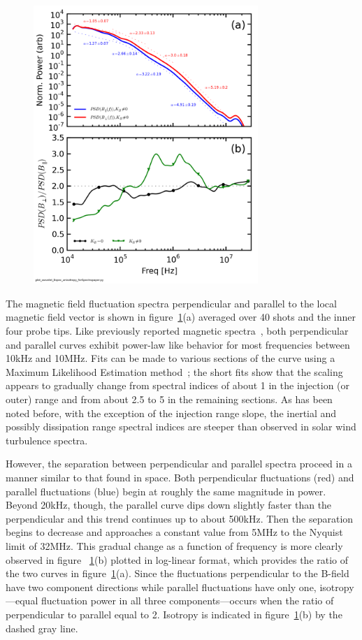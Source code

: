 \documentclass[aip,prl,amsmath,amssymb,reprint,superscriptaddress]{revtex4-1} %
\begin{document}
\begin{figure}[!htbp]
\centerline{
\includegraphics[width=8.5cm]{Bperppara_chan1t4_1mWbspectra_40t60us_wAsymRatio}}
\caption{\label{fig:spectra}}
\end{figure}

The magnetic field fluctuation spectra perpendicular and parallel to the local magnetic field vector is shown in figure~\ref{fig:spectra}(a) averaged over 40 shots and the inner four probe tips. Like previously reported magnetic spectra~\cite{schaffner14a}, both perpendicular and parallel curves exhibit power-law like behavior for most frequencies between 10kHz and 10MHz. Fits can be made to various sections of the curve using a Maximum Likelihood Estimation method~\cite{clauset09}; the short fits show that the scaling appears to gradually change from spectral indices of about 1 in the injection (or outer) range and from about 2.5 to 5 in the remaining sections. As has been noted before, with the exception of the injection range slope, the inertial and possibly dissipation range spectral indices are steeper than observed in solar wind turbulence spectra.

However, the separation between perpendicular and parallel spectra proceed in a manner similar to that found in space. Both perpendicular fluctuations (red) and parallel fluctuations (blue) begin at roughly the same magnitude in power. Beyond 20kHz, though, the parallel curve dips down slightly faster than the perpendicular and this trend continues up to about 500kHz. Then the separation begins to decrease and approaches a constant value from 5MHz to the Nyquist limit of 32MHz. This gradual change as a function of frequency is more clearly observed in figure ~\ref{fig:spectra}(b) plotted in log-linear format, which provides the ratio of the two curves in figure~\ref{fig:spectra}(a). Since the fluctuations perpendicular to the B-field have two component directions while parallel fluctuations have only one, isotropy---equal fluctuation power in all three components---occurs when the ratio of perpendicular to parallel equal to 2. Isotropy is indicated in figure~\ref{fig:spectra}(b) by the dashed gray line.
\end{document}
